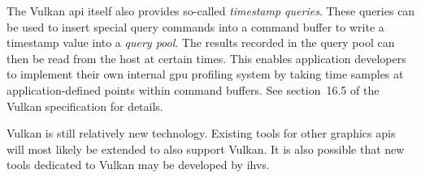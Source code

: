     The Vulkan \gls{api} itself also provides so-called \textit{timestamp queries}.
    These queries can be used to insert special query commands into a command buffer to write a timestamp value into a \textit{query pool}.
    The results recorded in the query pool can then be read from the host at certain times.
    This enables application developers to implement their own internal \acrshort{gpu} profiling system by taking time samples at application-defined points within command buffers.
    See section~16.5 of the Vulkan specification\cite{vkspec} for details.

    Vulkan is still relatively new technology.
    Existing tools for other graphics \glspl{api} will most likely be extended to also support Vulkan.
    It is also possible that new tools dedicated to Vulkan may be developed by \glspl{ihv}.
